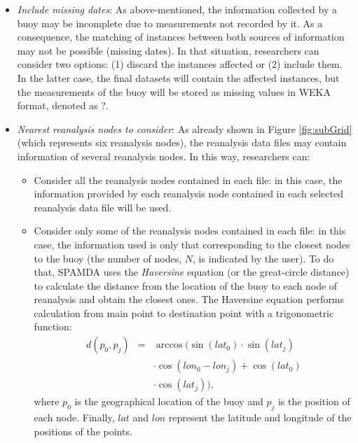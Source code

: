 \documentclass[energies,article,accept,moreauthors,pdftex]{Definitions/mdpi}
\begin{document}
\begin{paracol}{2}
\begin{itemize}
					\item \textit{Include missing dates}: As above-mentioned, the information collected by a buoy may be incomplete due to measurements not recorded by it. As a consequence, the matching of instances between both sources of information may not be possible (missing dates). In that situation, researchers can consider two options: (1) discard the instances affected or (2) include them. In the latter case, the final datasets will contain the affected instances, but the measurements of the buoy will be stored as missing values in WEKA format, denoted as \guillemotleft?\guillemotright.
					
					\item \textit{Nearest reanalysis nodes to consider}: As already shown in Figure \ref{fig:subGrid} (which represents six reanalysis nodes), the reanalysis data files may contain information of several reanalysis nodes. In this way, researchers can:
					
						\begin{itemize}
							
							\item Consider all the reanalysis nodes contained in each file: in this case, the information provided by each reanalysis node contained in each selected reanalysis data file will be used.
							
							\item Consider only some of the reanalysis nodes contained in each file: in this case, the information used is only that corresponding to the closest nodes to the buoy (the number of nodes, $N$, is indicated by the user). To do that, SPAMDA uses the \textit{Haversine} equation \cite{Haversine_2009} (or the great-circle distance) to calculate the distance from the location of the buoy to each node of reanalysis and obtain the closest ones. The Haversine equation performs calculation from main point to destination point with a trigonometric function:
								\begin{eqnarray}
									\label{eq:Haversine}
									d(p_0,p_j) & = & \arccos(\sin(lat_0)\cdot \sin(lat_j) \nonumber \\
									& & \cdot \cos(lon_0-lon_j) + \cos(lat_0) \\
									& & \cdot \cos(lat_j)), \nonumber 
								\end{eqnarray}
where $p_0$ is the geographical location of the buoy and $p_j$ is the position of each node. Finally, $lat$ and $lon$ represent the latitude and longitude of the positions of the points.
						\end{itemize}
					

\end{itemize}
\end{paracol}
\end{document}
